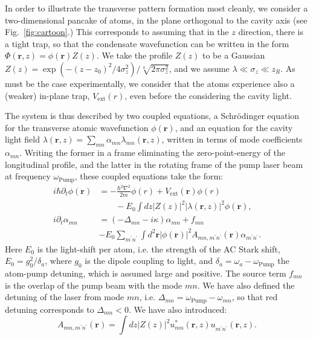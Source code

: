 \documentclass[pra,twocolumn,superscriptaddress]{revtex4-1}
\newcommand{\vect}[1]{\mathbf{#1}}
\newcommand{\light}{\lambda}
\newcommand{\mode}{\lambda}
\newcommand{\wf}{\phi}
\newcommand{\wfz}{\Phi}
\begin{document}
In order to illustrate the transverse pattern formation most cleanly,
we consider a two-dimensional pancake of atoms, in the plane
orthogonal to the cavity axis (see Fig.~\ref{fig:cartoon}.)  This
corresponds to assuming that in the $z$ direction, there is a tight
trap, so that the condensate wavefunction can be written in the form
$\wfz(\vect r, z)=\wf(\vect r) Z(z)$.  We take the profile $Z(z)$ to
be a Gaussian $Z(z) = \exp(-(z-z_0)^2/4 \sigma_z^2) /
\sqrt[4]{2\pi\sigma_z^2}$, and we assume $\lambda \ll \sigma_z \ll
z_R$.  As must be the case experimentally, we consider that the atoms
experience also a (weaker) in-plane trap, $V_{\text{ext}}(r)$, even
before the considering the cavity light.


The system is thus described by two coupled equations, a Schr\"odinger
equation for the transverse atomic wavefunction $\wf(\vect r)$, and
an equation for the cavity light field $\light(\vect{r}, z) =
\sum_{mn} \alpha_{mn} \mode_{mn}(\vect{r},z)$, written in terms of mode
coefficients $\alpha_{mn}$.  Writing the former in a frame eliminating
the zero-point-energy of the longitudinal profile, and the latter in
the rotating frame of the pump laser beam at frequency
$\omega_{\text{Pump}}$, these coupled equations take the form:
\begin{align}
  \label{eq:1}
  i \hbar \partial_t \wf(\vect r) &=
  - \frac{\hbar^2 \nabla^2}{2m} \wf(r)
  + V_{\text{ext}}(\vect{r}) \wf(r)
  \nonumber\\&\qquad
  - E_0 \int dz |Z(z)|^2 |\light(\vect{r},z)|^2  \wf(\vect r),
  \\
  \label{eq:3}
  i \partial_t \alpha_{mn}
  &= (-\Delta_{mn} -i \kappa) \alpha_{mn} 
  +
  f_{mn} 
  \nonumber\\&
  - E_0 \sum_{m^\prime n^\prime} 
  \int d^2{\vect r}  |\wf(\vect{r})|^2 A_{mn,m^\prime n^\prime}(\vect r)
  \alpha_{m^\prime n^\prime}.
\end{align}
Here $E_0$ is the light-shift per atom, i.e. the strength of the AC
Stark shift, $E_0=g_0^2/\delta_a$, where $g_0$ is the dipole coupling
to light, and $\delta_a=\omega_a-\omega_\text{Pump}$ the atom-pump
detuning, which is assumed large and positive.  The source term
$f_{mn}$ is the overlap of the pump beam with the mode $mn$.  We have
also defined the detuning of the laser from mode $mn$,
i.e. $\Delta_{mn} = \omega_{\text{Pump}} - \omega_{mn}$, so that red
detuning corresponds to $\Delta_{mn} < 0$. We have also introduced:
\begin{displaymath}
  A_{mn,m^\prime n^\prime}(\vect r)
  =
  \int dz |Z(z)|^2
  u^\ast_{mn}(\vect{r},z) u^{}_{m^\prime n^\prime}(\vect{r},z).
\end{displaymath}
\end{document}
